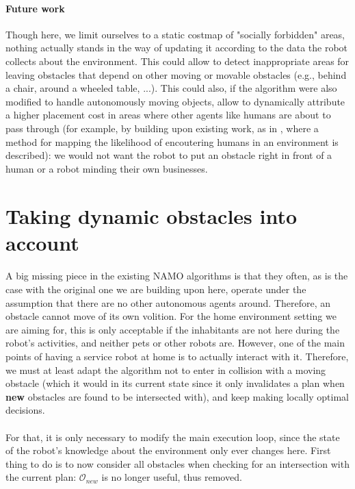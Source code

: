 \paragraph{Future work} Though here, we limit ourselves to a static costmap of "socially forbidden" areas, nothing actually stands in the way of updating it according to the data the robot collects about the environment. This could allow to detect inappropriate areas for leaving obstacles that depend on other moving or movable obstacles (e.g., behind a chair, around a wheeled table, ...). This could also, if the algorithm were also modified to handle autonomously moving objects, allow to dynamically attribute a higher placement cost in areas where other agents like humans are about to pass through (for example, by building upon existing work, as in \parencite{jumel_mapping_2017}, where a method for mapping the likelihood of encoutering humans in an environment is described): we would not want the robot to put an obstacle right in front of a human or a robot minding their own businesses.

\section{Taking dynamic obstacles into account}\label{dynamic_section}

\paragraph{} A big missing piece in the existing NAMO algorithms is that they often, as is the case with the original one we are building upon here, operate under the assumption that there are no other autonomous agents around. Therefore, an obstacle cannot move of its own volition. For the home environment setting we are aiming for, this is only acceptable if the inhabitants are not here during the robot's activities, and neither pets or other robots are. However, one of the main points of having a service robot at home is to actually interact with it. Therefore, we must at least adapt the algorithm not to enter in collision with a moving obstacle (which it would in its current state since it only invalidates a plan when \textbf{new} obstacles are found to be intersected with), and keep making locally optimal decisions.

\paragraph{} For that, it is only necessary to modify the main execution loop, since the state of the robot's knowledge about the environment only ever changes here. First thing to do is to now consider all obstacles when checking for an intersection with the current plan: $\mathcal{O}_{new}$ is no longer useful, thus removed.

